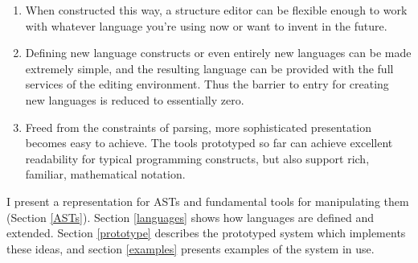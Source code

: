 \begin{enumerate}

\item When constructed this way, a structure editor can be flexible enough to work with whatever language you're using now or want to invent in the future.

\item Defining new language constructs or even entirely new languages can be made extremely simple, and the resulting language can be provided with the full services of the editing environment. Thus the barrier to entry for creating new languages is reduced to essentially zero.

\item Freed from the constraints of parsing, more sophisticated presentation becomes easy to achieve. The tools prototyped so far can achieve excellent readability for typical programming constructs, but also support rich, familiar, mathematical notation.

\end{enumerate}

I present a representation for ASTs and fundamental tools for manipulating them (Section \ref{ASTs}). Section \ref{languages} shows how languages are defined and extended. Section \ref{prototype} describes the prototyped system which implements these ideas, and section \ref{examples} presents examples of the system in use. 


